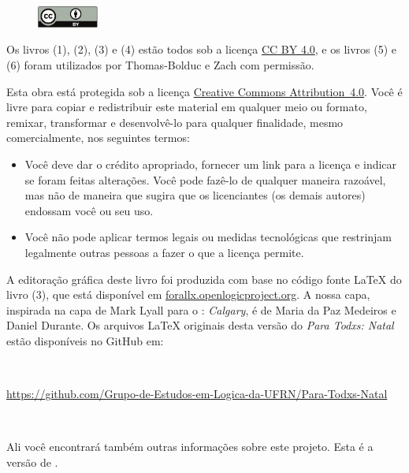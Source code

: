\clearpage

\begin{figure}[t]
\includegraphics[width=2cm,center]{./assets/by}
\end{figure}

Os livros (1), (2), (3) e (4) estão todos sob a licença \href{https://creativecommons.org/licenses/by/4.0/}{CC BY 4.0}, e os livros (5) e (6) foram utilizados por Thomas-Bolduc e Zach com permissão.\label{cc4by}




Esta obra está protegida sob a licença \href{https://creativecommons.org/licenses/by/4.0/}{Creative Commons \hbox{Attribution 4.0}}. 
Você é livre para copiar e redistribuir este material em qualquer meio ou formato, remixar, transformar e desenvolvê-lo para qualquer finalidade, mesmo comercialmente, nos seguintes termos:
\begin{itemize}\label{cc4by}
\item Você deve dar o crédito apropriado, fornecer um link para a licença e indicar se foram feitas alterações. Você pode fazê-lo de qualquer maneira razoável, mas não de maneira que sugira que os licenciantes (os demais autores) endossam você ou seu uso.
\item Você não pode aplicar termos legais ou medidas tecnológicas que restrinjam legalmente outras pessoas a fazer o que a licença permite.
\end{itemize}

\noindent A editoração gráfica deste livro foi produzida com base no código fonte \LaTeX{} do livro (3),  que está disponível em \hbox{\href{https://forallx.openlogicproject.org}{forallx.openlogicproject.org}}.
A nossa capa, inspirada na capa de Mark Lyall para o \forallx: \textit{Calgary}, é de Maria da Paz Medeiros e Daniel Durante.
Os arquivos  \LaTeX{} originais desta versão do \textit{Para Todxs: Natal} estão disponíveis no GitHub em:

\

\hbox{{\footnotesize \url{https://github.com/Grupo-de-Estudos-em-Logica-da-UFRN/Para-Todxs-Natal}}} 

\

\noindent Ali você encontrará também outras informações sobre este projeto.
Esta é a versão de \mydate.

\vfill

\clearpage


